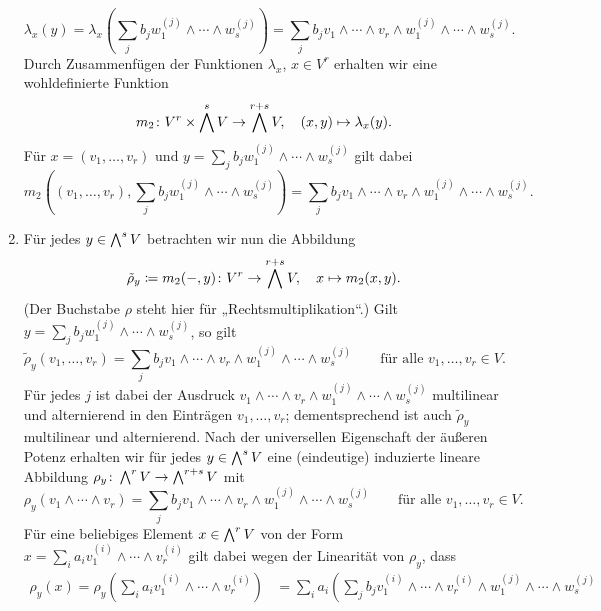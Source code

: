 \begin{enumerate}
    \[
        \lambda_x( y )
      = \lambda_x\left( \sum_j b_j w^{(j)}_1 \wedge \dotsb \wedge w^{(j)}_s \right)
      = \sum_j b_j v_1 \wedge \dotsb \wedge v_r \wedge w^{(j)}_1 \wedge \dotsb \wedge w^{(j)}_s.
    \]
    Durch Zusammenfügen der Funktionen $\lambda_x$, $x \in V^r$ erhalten wir eine wohldefinierte Funktion
    \[
              m_2
      \colon  V^r \times \bigwedge^{s} V
      \to     \bigwedge^{r+s} V,
      \quad   (x, y)
      \mapsto \lambda_x(y).
    \]
    Für $x = (v_1, \dotsc, v_r)$ und $y = \sum_j b_j w^{(j)}_1 \wedge \dotsb \wedge w^{(j)}_s$ gilt dabei
    \[
        m_2\left( (v_1, \dotsc, v_r), \sum_j b_j w^{(j)}_1 \wedge \dotsb \wedge w^{(j)}_s \right)
      = \sum_j b_j v_1 \wedge \dotsb \wedge v_r \wedge w^{(j)}_1 \wedge \dotsb \wedge w^{(j)}_s.
    \]
    
  \item
    Für jedes $y \in \bigwedge^{s} V$ betrachten wir nun die Abbildung
    \[
                \tilde{\rho}_y
      \coloneqq m_2(-, y)
      \colon    V^r
      \to       \bigwedge^{r+s} V,
      \quad     x
      \mapsto   m_2(x,y).
    \]
    (Der Buchstabe $\rho$ steht hier für „Rechtsmultiplikation“.)
    Gilt $y = \sum_j b_j w^{(j)}_1 \wedge \dotsb \wedge w^{(j)}_s$, so gilt
    \[
        \tilde{\rho}_y(v_1, \dotsc, v_r)
      = \sum_j b_j v_1 \wedge \dotsb \wedge v_r \wedge w^{(j)}_1 \wedge \dotsb \wedge w^{(j)}_s
      \qquad
      \text{für alle $v_1, \dotsc, v_r \in V$}.
    \]
    Für jedes $j$ ist dabei der Ausdruck $v_1 \wedge \dotsb \wedge v_r \wedge w^{(j)}_1 \wedge \dotsb \wedge w^{(j)}_s$ multilinear und alternierend in den Einträgen $v_1, \dotsc, v_r$;
    dementsprechend ist auch $\tilde{\rho}_y$ multilinear und alternierend.
    Nach der universellen Eigenschaft der äußeren Potenz erhalten wir für jedes $y \in \bigwedge^{s} V$ eine (eindeutige) induzierte lineare Abbildung $\rho_y \colon \bigwedge^{r} V \to \bigwedge^{r+s} V$ mit
    \[
        \rho_y(v_1 \wedge \dotsb \wedge v_r)
      = \sum_j b_j v_1 \wedge \dotsb \wedge v_r \wedge w^{(j)}_1 \wedge \dotsb \wedge w^{(j)}_s
      \qquad
      \text{für alle $v_1, \dotsc, v_r \in V$}.
    \]
    Für eine beliebiges Element $x \in \bigwedge^{r} V$ von der Form $x = \sum_i a_i v^{(i)}_1 \wedge \dotsb \wedge v^{(i)}_r$ gilt dabei wegen der Linearität von $\rho_y$, dass
    \begin{align*}
          \rho_y(x)
      =   \rho_y\left( \sum_i a_i v^{(i)}_1 \wedge \dotsb \wedge v^{(i)}_r \right)
      &=  \sum_i a_i \left(
                       \sum_j b_j v^{(i)}_1 \wedge \dotsb \wedge v^{(i)}_r \wedge w^{(j)}_1 \wedge \dotsb \wedge w^{(j)}_s

\end{align*}
\end{enumerate}
